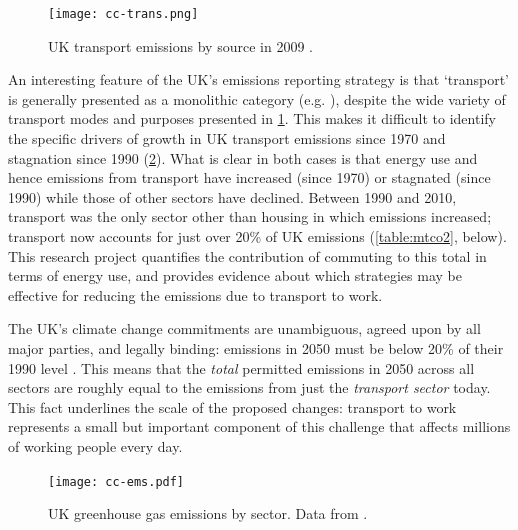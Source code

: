 \begin{figure}[h]
 \centering
 \texttt{[image: cc-trans.png]}
 \caption{UK transport emissions by source in 2009 \citep{Decc2011t}.}
 \label{fig:cc-trans}
\end{figure}

An interesting feature of the UK's emissions reporting strategy is that
`transport' is generally presented as a monolithic category (e.g.
\citealp{Decc2010}), despite the wide variety of transport modes and purposes
presented in \cref{fig:cc-trans}. This makes it difficult to identify the
specific drivers of growth in UK transport emissions since 1970
\citep{Gasparatos2009} and stagnation since 1990 (\cref{fig:cc-ems}).
What is clear in
both cases is that energy use and hence emissions from transport have increased
(since 1970) or stagnated (since 1990) while those of other sectors have
declined. Between 1990 and 2010, transport was the only sector other than
housing in which emissions increased; transport now accounts for just over 20\%
of UK emissions (\cref{table:mtco2}, below). This research project quantifies
the contribution of commuting to this total in terms of energy use, and provides evidence
about which strategies may be effective for reducing the emissions due to
transport to work.

The UK's climate change commitments are unambiguous, agreed upon by all major
parties, and legally binding: emissions in 2050 must be below 20\% of their 1990
level \citep{ClimateChangeAct2008}. This means that the \emph{total}
permitted emissions in 2050 across all sectors are roughly equal to the emissions from
just the \emph{transport sector} today. This fact underlines the scale of the
proposed changes: transport to work represents a small but important component
of this challenge that affects millions of working people every day.

\begin{figure}[h]
 \centerline{
 \texttt{[image: cc-ems.pdf]}}
\caption{UK greenhouse gas emissions by sector. Data from
 \citet{Decc2011ff}.}
 \label{fig:cc-ems}
\end{figure}

